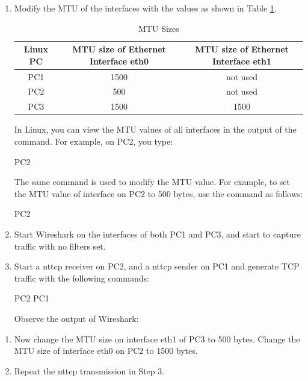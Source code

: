 \begin{enumerate}
	\item Modify the MTU of the interfaces with the values as shown in Table \ref{tab:lab5-mtus}.
		\begin{table}[ht]
			\centering
			\begin{tabular}{ | c | c | c | }	
				\hline
				\textbf{Linux PC} & \textbf{MTU size of Ethernet Interface eth0} & \textbf{MTU size of Ethernet Interface eth1} \\ \hline
				PC1 & 1500 & not used \\ 
				PC2 & 500 & not used \\
				PC3 & 1500 & 1500 \\ \hline
			\end{tabular}
			\caption{MTU Sizes}
			\label{tab:lab5-mtus}
		\end{table}
		In Linux, you can view the MTU values of all interfaces in the output of the  command. For example, on PC2, you type:
		\begin{cmdblock}
	PC2%
		\end{cmdblock}
		The same command is used to modify the MTU value. For example, to set the MTU value of interface  on PC2 to 500 bytes, use the  command as follows:
		\begin{cmdblock}
	PC2%
		\end{cmdblock}
	\item Start Wireshark on the  interfaces of both PC1 and PC3, and start to capture traffic with no filters set.
	\item Start a nttcp receiver on PC2, and a nttcp sender on PC1 and generate TCP traffic with the following commands:
		\begin{cmdblock}
	PC2%
	PC1%
		\end{cmdblock}
		Observe the output of Wireshark:
\end{enumerate}

\begin{questions}
\end{questions}

\begin{enumerate}[resume]
	\item Now change the MTU size on interface eth1 of PC3 to 500 bytes. Change the MTU size of interface eth0 on PC2 to 1500 bytes.
	\item Repeat the nttcp transmission in Step 3.
\end{enumerate}


